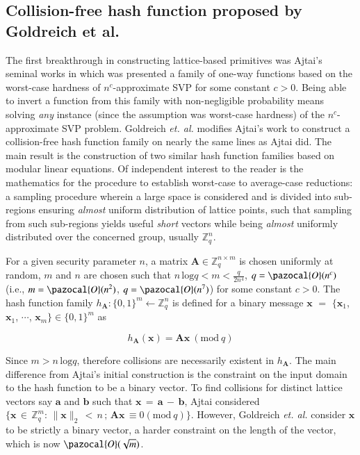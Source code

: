 \documentclass[10pt]{elsarticle}
\begin{document}
\subsection{Collision-free hash function proposed by Goldreich et al. \cite{CRHF_Goldreich1996}}
The first breakthrough in constructing lattice-based primitives was
Ajtai's seminal works \cite{CRHF_Ajtai1996,CRHF_BBD} in which was
presented a family of one-way functions based on the worst-case
hardness of $n^{c}$-approximate SVP for some constant $c>0$. Being
able to invert a function from this family with non-negligible
probability means solving \textit{any} instance (since the
assumption was worst-case hardness) of the $n^{c}$-approximate SVP
problem. Goldreich \textit{et. al.} \cite{CRHF_Goldreich1996}
modifies Ajtai's work \cite{CRHF_Ajtai1996} to construct a
collision-free hash function family on nearly the same lines as
Ajtai did. The main result is the construction of two similar hash
function families based on modular linear equations. Of independent
interest to the reader is the mathematics for the procedure to
establish worst-case to average-case reductions: a sampling
procedure wherein a large space is considered and is divided into
sub-regions ensuring \textit{almost} uniform distribution of lattice
points, such that sampling from such sub-regions yields useful
\textit{short} vectors while being \textit{almost} uniformly
distributed over the concerned group, usually $\mathbb{Z}_{q}^{n}$.

For a given security parameter $n$, a matrix
$\mathbf{A}\in\mathbb{Z}_{q}^{n\times m}$ is chosen uniformly at
random, $m$ and $n$ are chosen such that $n\,\mbox{log}q<
m<\frac{q}{2n^{4}}$, $q=\pazocal{O}(n^{c})$ (i.e.,
$m=\pazocal{O}(n^{2})$, $q=\pazocal{O}(n^{7})$) for some constant
$c>0$. The hash function family $h_{\mathbf{A}}:\{0,
1\}^{m}\leftarrow\mathbb{Z}_{q}^{n}$ is defined for a binary message
$\mathbf{x}$ $=$ $\{\mathbf{x}_{1}$, $\mathbf{x}_{1}$, $\cdots$,
$\mathbf{x}_{m}\}\in\{0, 1\}^{m}$ as

$$h_{\mathbf{A}}(\mathbf{x})=\mathbf{A}\mathbf{x}~(\mbox{mod}~q)$$

Since $m>n\,\mbox{log}q$, therefore collisions are necessarily
existent in $h_{\mathbf{A}}$. The main difference from Ajtai's
initial construction is the constraint on the input domain to the
hash function to be a binary vector. To find collisions for distinct
lattice vectors say $\mathbf{a}$ and $\mathbf{b}$ such that
$\mathbf{x}\,=\,\mathbf{a} \, - \, \mathbf{b}$, Ajtai considered
$\{\mathbf{x}\,\in\,\mathbb{Z}_{q}^{m}:\,\parallel \mathbf{x}
\parallel_{2}\,<\,n \,;\,\mathbf{A}\mathbf{x}\,\equiv 0(\mbox{mod}~q)\}$.
However, Goldreich \textit{et. al.} \cite{CRHF_Goldreich1996}
consider $\mathbf{x}$ to be strictly a binary vector, a harder
constraint on the length of the vector, which is now
$\pazocal{O}(\sqrt{m})$.
\end{document}
